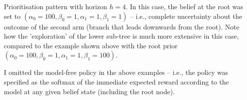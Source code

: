\documentclass{article}
\begin{document}


\newpage
Prioritisation pattern with horizon $h=4$. In this case, the belief at the root was set to 
$(\alpha_0=100, \beta_0=1, \alpha_1=1, \beta_1=1)$ -- i.e., complete uncertainty about 
the outcome of the second arm (branch that leads downwards from the root). Note how the 
'exploration' of the lower sub-tree is much more extensive in this case, compared to the 
example shown above with the root prior $(\alpha_0=100, \beta_0=1, \alpha_1=1, \beta_1=100)$.
\vspace{1cm}



\newpage
I omitted the model-free policy in the above examples -- i.e., the policy was specified as the 
softmax of the immediate expected reward according to the model at any given belief state 
(including the root node). 
\end{document}
